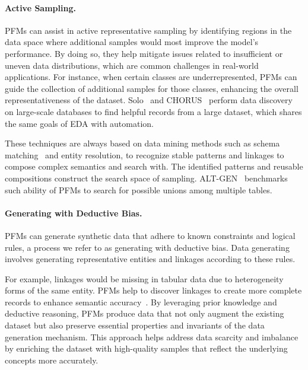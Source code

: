   \paragraph{Active Sampling.}
  
  PFMs can assist in active representative sampling by identifying regions in the data space where additional samples would most improve the model's performance. By doing so, they help mitigate issues related to insufficient or uneven data distributions, which are common challenges in real-world applications. For instance, when certain classes are underrepresented, PFMs can guide the collection of additional samples for those classes, enhancing the overall representativeness of the dataset. Solo~\cite{Wang2023SoloDD} and CHORUS~\cite{CHORUS} perform data discovery on large-scale databases to find helpful records from a large dataset, which shares the same goals of EDA with automation. 
  
  These techniques are always based on data mining methods such as schema matching~\cite{LLMschema} and entity resolution, to recognize stable patterns and linkages to compose complex semantics and search with. The identified patterns and reusable compositions construct the search space of sampling. ALT-GEN~\cite{tabulargeneration} benchmarks such ability of PFMs to search for possible unions among multiple tables. 
  
  \paragraph{Generating with Deductive Bias.}
  
  PFMs can generate synthetic data that adhere to known constraints and logical rules, a process we refer to as generating with deductive bias. Data generating involves generating representative entities and linkages according to these rules. 
  
  
  For example, linkages would be missing in tabular data due to heterogeneity forms of the same entity. PFMs help to discover linkages to create more complete records to enhance semantic accuracy~\cite{Nobari2023DTTAE}. By leveraging prior knowledge and deductive reasoning, PFMs produce data that not only augment the existing dataset but also preserve essential properties and invariants of the data generation mechanism. This approach helps address data scarcity and imbalance by enriching the dataset with high-quality samples that reflect the underlying concepts more accurately.
  
